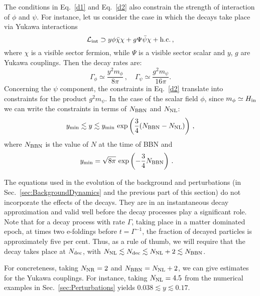 \documentclass[a4paper, amsfonts, amssymb, amsmath, reprint, showkeys, nofootinbib, twoside, superscriptaddress]{revtex4-1}
\begin{document}
The conditions in Eq.~\eqref{d1} and Eq.~\eqref{d2} also constrain the strength of interaction of $\phi$ and $\psi$. For instance, let us consider the case in which the decays take place via Yukawa interactions
%
\begin{equation}
\mathcal{L}_{\rm int} \supset y \phi \bar{\chi} \chi + g \Psi \bar{\psi} \chi + \text{h.c.} \,,
\end{equation}
%
where $\chi$ is a visible sector fermion, while $\Psi$ is a visible sector scalar and $y$, $g$ are  Yukawa couplings. Then the decay rates are: 
\begin{equation}
\Gamma_\phi \simeq \frac{y^2 m_\phi}{8 \pi} \,, \quad \Gamma_{\psi} \simeq \frac{g^2 m_\psi}{16 \pi}.
\end{equation}
%
Concerning the $\psi$ component, the constraints in Eq.~\eqref{d2} translate into constraints for the product $g^2 m_\psi$. In the case of the scalar field $\phi$, since $m_\phi \simeq H_{\rm in}$ we can write the constraints in terms of $N_{\rm BBN}$ and $N_{\rm NL}$:
\begin{align}
y_{\rm min} \lesssim y \lesssim y_{\rm min} \, \exp\left(\frac{3}{4} (N_{\rm BBN} - N_{\rm NL})\right) \,,
\end{align}
where $N_{\rm BBN}$ is the value of $N$ at the time of BBN and
\begin{align}
&y_{\rm min} = \sqrt{8 \pi} \, \exp\left(-\frac{3}{4} N_{\rm BBN}\right) \,. \nonumber
\end{align}

The equations used in the evolution of the background and perturbations (in Sec.~\ref{sec:BackgroundDynamics} and the previous part of this section) do not incorporate the effects of the decays. They are in an instantaneous decay approximation and valid well before the decay processes play a significant role. Note that for a decay process with rate $\Gamma$, taking place in a matter dominated epoch, at times two e-foldings before $ t = \Gamma^{-1}$, the fraction of decayed particles is approximately five per cent. Thus, as a rule of thumb, we will require that the decay takes place at $N_{\rm dec}$, with $N_{\rm NL} \lesssim N_{\rm dec} \lesssim N_{\rm NL} + 2 \lesssim N_{\rm BBN}$.

For concreteness, taking $N_{\rm NR} = 2$ and $N_{\rm BBN} = N_{\rm NL} + 2$, we can give estimates for the Yukawa couplings. For instance, taking $N_{\rm NL} = 4.5$ from the numerical examples in Sec.~\ref{sec:Perturbations} yields $0.038 \lesssim y \lesssim 0.17$. %
\end{document}
